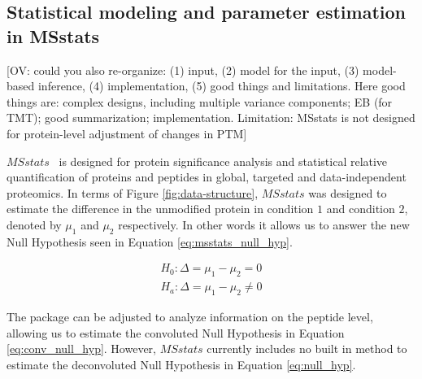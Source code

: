 \documentclass[mcp]{article}
\numberwithin{table}{section}
\def\todo#1{{\color{red}[#1]}}
\begin{document}
\subsection*{Statistical modeling and parameter estimation in MSstats}

\todo{OV: could you also re-organize: (1) input, (2) model for the input, (3) model-based inference, (4) implementation, (5) good things and limitations. Here good things are: complex designs, including multiple variance components; EB (for TMT); good summarization; implementation. Limitation: MSstats is not designed for protein-level adjustment of changes in PTM}

$MSstats$~\cite{Choi:2014} is designed for protein significance analysis and statistical relative quantification of proteins and peptides in global, targeted and data-independent proteomics. In terms of Figure \ref{fig:data-structure}, $MSstats$ was designed to estimate the difference in the unmodified protein in condition $1$ and condition $2$, denoted by $\mu_1$ and $\mu_2$ respectively. In other words it allows us to answer the new Null Hypothesis seen in Equation \ref{eq:msstats_null_hyp}.

\begin{equation}
\begin{aligned}
H_{0}: \Delta = \mu_{1} - \mu_{2} = 0 \\
H_{a}: \Delta = \mu_{1} - \mu_{2} \neq 0
\end{aligned}
\label{eq:msstats_null_hyp}
\end{equation}

The package can be adjusted to analyze information on the peptide level, allowing us to estimate the convoluted Null Hypothesis in Equation \ref{eq:conv_null_hyp}. However, $MSstats$ currently includes no built in method to estimate the deconvoluted Null Hypothesis in Equation \ref{eq:null_hyp}.
\end{document}
